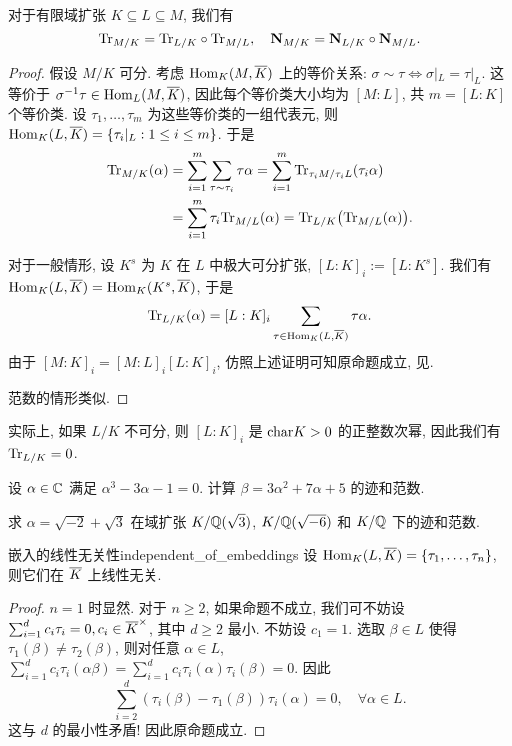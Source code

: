 \begin{corollary}{}{}
对于有限域扩张 $K\subseteq L\subseteq M$, 我们有
  \[{\mathrm{Tr}}_{M/K}={\mathrm{Tr}}_{L/K}\circ {\mathrm{Tr}}_{M/L},\quad {\mathbf{N}}_{M/K}={\mathbf{N}}_{L/K}\circ {\mathbf{N}}_{M/L}.\]
\end{corollary}
\begin{proof}
假设 $M/K$ 可分. 考虑 ${\mathrm{Hom}}_K(M,\overline K)$ 上的等价关系: $\sigma\sim\tau\iff \sigma|_L=\tau|_L$. 这等价于 $\sigma^{-1}\tau\in{\mathrm{Hom}}_L(M,\overline K)$, 因此每个等价类大小均为 $[M:L]$, 共 $m=[L:K]$ 个等价类. 设 $\tau_1,\dots,\tau_m$ 为这些等价类的一组代表元, 则 ${\mathrm{Hom}}_K(L,\overline K)=\left\{\tau_i|_L:1\le i\le m\right\}$. 于是
  \[\begin{split}
    {\mathrm{Tr}}_{M/K}(\alpha)&=\sum_{i=1}^m\sum_{\tau\sim\tau_i} \tau\alpha
      =\sum_{i=1}^m{\mathrm{Tr}}_{\tau_i M/\tau_i L}(\tau_i \alpha)\\
    &=\sum_{i=1}^m\tau_i{\mathrm{Tr}}_{M/L}(\alpha)
      ={\mathrm{Tr}}_{L/K}\bigl({\mathrm{Tr}}_{M/L}(\alpha)\bigr).
  \end{split}\]

对于一般情形, 设 $K^s$ 为 $K$ 在 $L$ 中极大可分扩张, $[L:K]_i:=[L:K^s]$. 我们有 ${\mathrm{Hom}}_{K}(L,\overline K)={\mathrm{Hom}}_K(K^s,\overline K)$, 于是
	\[{\mathrm{Tr}}_{L/K}(\alpha)=[L:K]_i\sum_{\tau\in{\mathrm{Hom}}_K(L,\overline K)}\tau\alpha.\]
由于 $[M:K]_i=[M:L]_i[L:K]_i$, 仿照上述证明可知原命题成立, 见\cite[Chapter II, \S 10]{ZariskiSamuel1958}.

范数的情形类似.
\end{proof}
\begin{remark}
实际上, 如果 $L/K$ 不可分, 则 $[L:K]_i$ 是 ${\mathrm{char}} K>0$ 的正整数次幂, 因此我们有 ${\mathrm{Tr}}_{L/K}=0$.
\end{remark}

\begin{exercise}
设 $\alpha\in{\mathbb{C}}$ 满足 $\alpha^3-3\alpha-1=0$. 计算 $\beta=3\alpha^2+7\alpha+5$ 的迹和范数.
\end{exercise}
\begin{exercise}
求 $\alpha=\sqrt{-2}+\sqrt3$ 在域扩张 $K/{\mathbb{Q}}(\sqrt3)$,  $K/{\mathbb{Q}}(\sqrt{-6})$ 和 $K/{\mathbb{Q}}$ 下的迹和范数.
\end{exercise}


\begin{proposition}{嵌入的线性无关性}{independent_of_embeddings}
设 ${\mathrm{Hom}}_K(L,\overline K)=\left\{\tau_1,\dots,\tau_n\right\}$, 则它们在 $\overline K$ 上线性无关.
\end{proposition}
\begin{proof}
$n=1$ 时显然. 对于 $n\ge2$, 如果命题不成立, 我们可不妨设 $\sum_{i=1}^d c_i\tau_i=0,c_i\in\overline K^\times$, 其中 $d\ge 2$ 最小. 不妨设 $c_1=1$. 选取 $\beta\in L$ 使得 $\tau_1(\beta)\neq\tau_2(\beta)$, 则对任意 $\alpha\in L$, $\sum_{i=1}^d c_i\tau_i(\alpha\beta)=\sum_{i=1}^d c_i\tau_i(\alpha)\tau_i(\beta)=0$. 因此
	\[\sum_{i=2}^d(\tau_i(\beta)-\tau_1(\beta))\tau_i(\alpha)=0,\quad\forall \alpha\in L.\]
这与 $d$ 的最小性矛盾! 因此原命题成立.
\end{proof}


